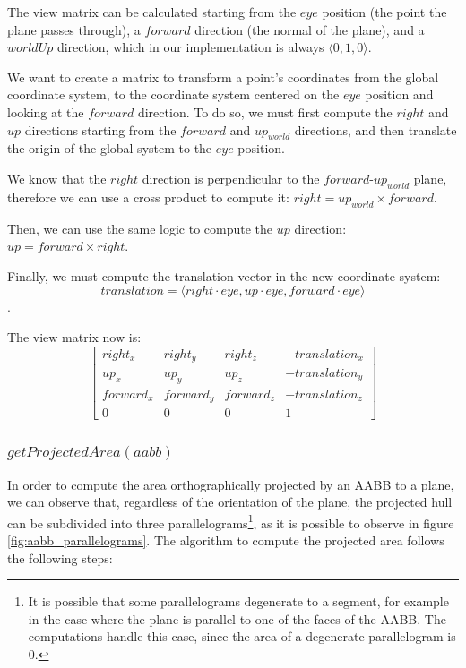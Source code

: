 \documentclass{PoliMi_MasterThesis}
\begin{document}
The view matrix can be calculated starting from the $eye$ position (the point the plane passes through), a $forward$ direction (the normal of the plane), and a $worldUp$ direction, which in our implementation is always $\langle 0, 1, 0 \rangle$.

We want to create a matrix to transform a point's coordinates from the global coordinate system, to the coordinate system centered on the $eye$ position and looking at the $forward$ direction. To do so, we must first compute the $right$ and $up$ directions starting from the $forward$ and $up_{world}$ directions, and then translate the origin of the global system to the $eye$ position.

We know that the $right$ direction is perpendicular to the $forward$-$up_{world}$ plane, therefore we can use a cross product to compute it: $right = up_{world} \times forward$.

Then, we can use the same logic to compute the $up$ direction: $up = forward \times right$.

Finally, we must compute the translation vector in the new coordinate system: $$translation = \langle right \cdot eye, up \cdot eye, forward \cdot eye \rangle$$.

The view matrix now is:
\begin{equation}
	\begin{bmatrix}
		right_x & right_y & right_z & -translation_x \\
		up_x & up_y & up_z & -translation_y \\
		forward_x & forward_y & forward_z & -translation_z \\
		0 & 0 & 0 & 1
	\end{bmatrix}
\end{equation}

\subsubsection*{$getProjectedArea(aabb)$}
In order to compute the area orthographically projected by an AABB to a plane, we can observe that, regardless of the orientation of the plane, the projected hull can be subdivided into three parallelograms\footnote{It is possible that some parallelograms degenerate to a segment, for example in the case where the plane is parallel to one of the faces of the AABB. The computations handle this case, since the area of a degenerate parallelogram is 0.}, as it is possible to observe in figure \ref{fig:aabb_parallelograms}. The algorithm to compute the projected area follows the following steps:
\end{document}
